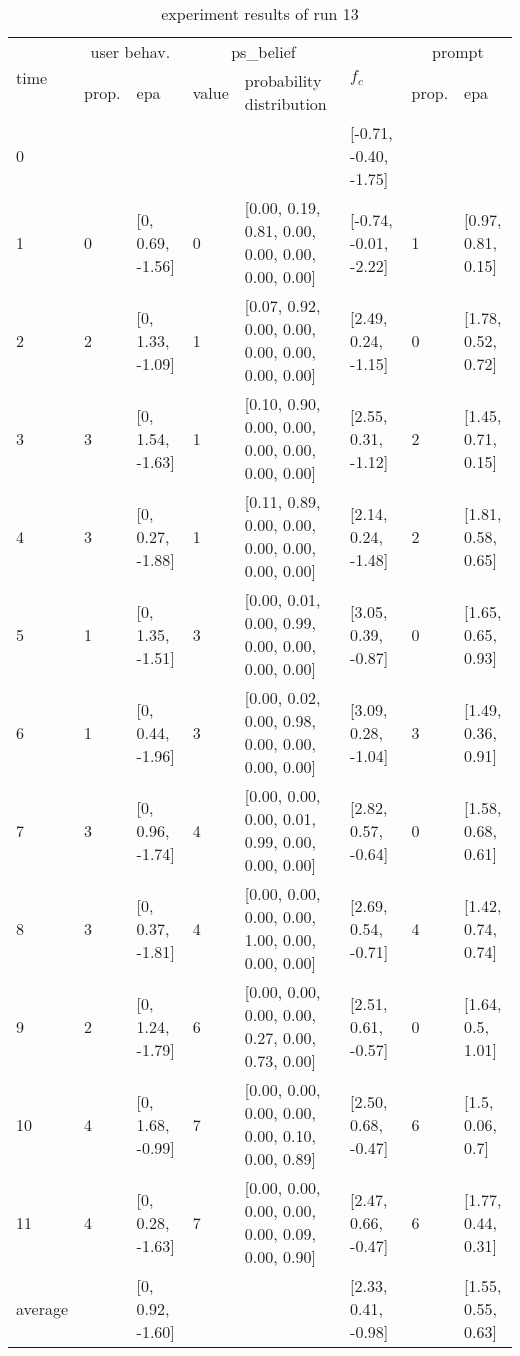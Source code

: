 \begin{table}[htbp]\footnotesize
\caption{experiment results of run 13}
\begin{center}
\begin{tabular}{|p{0.4cm}|p{0.6cm}|l|p{0.6cm}|p{3.3cm}|l|p{0.6cm}|l|}
\hline

\multirow{2}{*}{time} & \multicolumn{2}{c|}{user behav.} & \multicolumn{2}{c|}{ps\_belief} &
\multirow{2}{*}{$f_c$} & \multicolumn{2}{c|}{prompt} \\ \cline{2-5}\cline{ 7- 8}
& prop. & epa & value & probability distribution &  & prop. & epa \\ \hline

0 & \multicolumn{1}{l|}{} &  & \multicolumn{1}{l|}{} &  & [-0.71, -0.40, -1.75] & \multicolumn{1}{l|}{} &  \\ \hline
1 & 0 & [0, 0.69, -1.56] & 0 & [0.00, 0.19, 0.81, 0.00, 0.00, 0.00, 0.00, 0.00] & [-0.74, -0.01, -2.22] & 1 & [0.97, 0.81, 0.15] \\ \hline
2 & 2 & [0, 1.33, -1.09] & 1 & [0.07, 0.92, 0.00, 0.00, 0.00, 0.00, 0.00, 0.00] & [2.49, 0.24, -1.15] & 0 & [1.78, 0.52, 0.72] \\ \hline
3 & 3 & [0, 1.54, -1.63] & 1 & [0.10, 0.90, 0.00, 0.00, 0.00, 0.00, 0.00, 0.00] & [2.55, 0.31, -1.12] & 2 & [1.45, 0.71, 0.15] \\ \hline
4 & 3 & [0, 0.27, -1.88] & 1 & [0.11, 0.89, 0.00, 0.00, 0.00, 0.00, 0.00, 0.00] & [2.14, 0.24, -1.48] & 2 & [1.81, 0.58, 0.65] \\ \hline
5 & 1 & [0, 1.35, -1.51] & 3 & [0.00, 0.01, 0.00, 0.99, 0.00, 0.00, 0.00, 0.00] & [3.05, 0.39, -0.87] & 0 & [1.65, 0.65, 0.93] \\ \hline
6 & 1 & [0, 0.44, -1.96] & 3 & [0.00, 0.02, 0.00, 0.98, 0.00, 0.00, 0.00, 0.00] & [3.09, 0.28, -1.04] & 3 & [1.49, 0.36, 0.91] \\ \hline
7 & 3 & [0, 0.96, -1.74] & 4 & [0.00, 0.00, 0.00, 0.01, 0.99, 0.00, 0.00, 0.00] & [2.82, 0.57, -0.64] & 0 & [1.58, 0.68, 0.61] \\ \hline
8 & 3 & [0, 0.37, -1.81] & 4 & [0.00, 0.00, 0.00, 0.00, 1.00, 0.00, 0.00, 0.00] & [2.69, 0.54, -0.71] & 4 & [1.42, 0.74, 0.74] \\ \hline
9 & 2 & [0, 1.24, -1.79] & 6 & [0.00, 0.00, 0.00, 0.00, 0.27, 0.00, 0.73, 0.00] & [2.51, 0.61, -0.57] & 0 & [1.64, 0.5, 1.01] \\ \hline
10 & 4 & [0, 1.68, -0.99] & 7 & [0.00, 0.00, 0.00, 0.00, 0.00, 0.10, 0.00, 0.89] & [2.50, 0.68, -0.47] & 6 & [1.5, 0.06, 0.7] \\ \hline
11 & 4 & [0, 0.28, -1.63] & 7 & [0.00, 0.00, 0.00, 0.00, 0.00, 0.09, 0.00, 0.90] & [2.47, 0.66, -0.47] & 6 & [1.77, 0.44, 0.31] \\ \hline
\multicolumn{1}{|l|}{average} & \multicolumn{1}{l|}{} & [0, 0.92, -1.60] & \multicolumn{1}{l|}{} &  & [2.33, 0.41, -0.98] & \multicolumn{1}{l|}{} & [1.55, 0.55, 0.63] \\ \hline
\end{tabular}
\end{center}
\label{}
\end{table}
